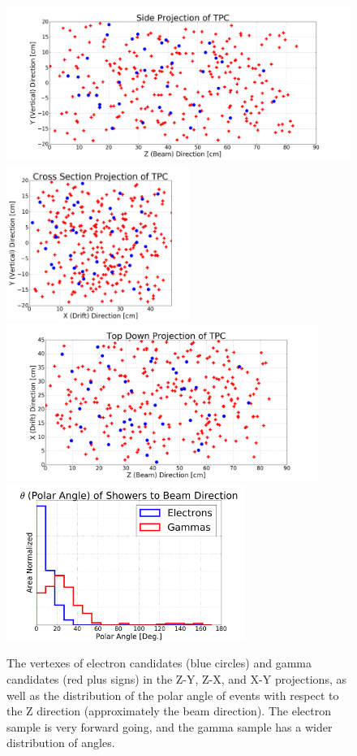 \begin{figure}[p]
   \centering
   
   \includegraphics[height=2in]{emshower_figures/yz_projection.png}
   \includegraphics[height=2in]{emshower_figures/xy_projection.png}
   \includegraphics[height=2in]{emshower_figures/xz_projection.png}
   \includegraphics[height=2in]{emshower_figures/theta_distribution.png}
   \caption[Vertex Distributions of Electromagnetic Showers.]{The vertexes of electron candidates (blue circles) and gamma candidates (red plus signs) in the Z-Y, Z-X, and X-Y projections, as well as the distribution of the polar angle of events with respect to the Z direction (approximately the beam direction).  The electron sample is very forward going, and the gamma sample has a wider distribution of angles. }
   \label{fig:geomety_dists}
 \end{figure} 

